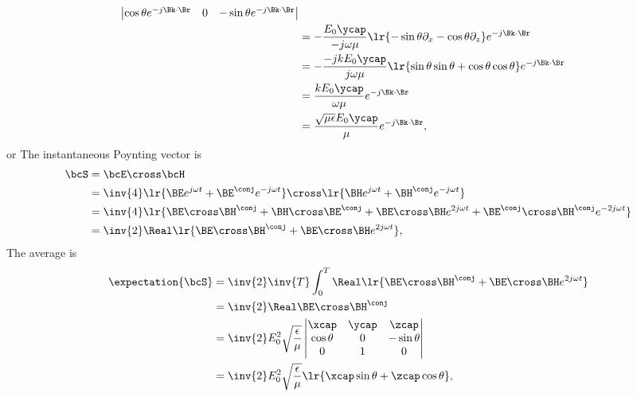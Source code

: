 {{\begin{equation}
\begin{aligned}
\begin{vmatrix}
\cos\theta
e^{-j \Bk \cdot \Br} & 0 &
- \sin\theta
e^{-j \Bk \cdot \Br}
\end{vmatrix}
\\ &=
-\frac{E_0 \ycap}{-j \omega \mu}
\lr{
-\sin\theta \partial_x
-\cos\theta \partial_z
}
e^{-j \Bk \cdot \Br}
\\ &=
-\frac{-j k E_0 \ycap}{j \omega \mu}
\lr{
\sin\theta \sin\theta +
\cos\theta \cos\theta
}
e^{-j \Bk \cdot \Br}
\\ &=
\frac{k E_0 \ycap}{\omega \mu}
e^{-j \Bk \cdot \Br}
\\ &=
\frac{\sqrt{\mu \epsilon}E_0 \ycap}{\mu}
e^{-j \Bk \cdot \Br},
\end{aligned}
\end{equation}
or
The instantaneous Poynting vector is
\begin{equation}\label{eqn:emtproblemSet6Problem3:220}
\begin{aligned}
\bcS
&= \bcE \cross \bcH
\\ &= \inv{4}
\lr{ \BE e^{j \omega t} + \BE^\conj e^{-j\omega t} }
\cross
\lr{ \BH e^{j \omega t} + \BH^\conj e^{-j\omega t} }
\\ &=
\inv{4}
\lr{
\BE \cross \BH^\conj + \BH \cross \BE^\conj + \BE \cross \BH e^{2 j \omega t} + \BE^\conj \cross \BH^\conj e^{-2 j \omega t}
}
\\ &=
\inv{2}
\Real \lr{
\BE \cross \BH^\conj + \BE \cross \BH e^{2 j \omega t}
},
\end{aligned}
\end{equation}
The average is
\begin{equation}\label{eqn:emtproblemSet6Problem3:240}
\begin{aligned}
\expectation{\bcS}
&=
\inv{2}
\inv{T} \int_0^T
\Real \lr{
\BE \cross \BH^\conj + \BE \cross \BH e^{2 j \omega t}
}
\\ &=
\inv{2} \Real \BE \cross \BH^\conj
\\ &=
\inv{2} E_0^2 \sqrt{\frac{\epsilon}{\mu}}
\begin{vmatrix}
\xcap & \ycap & \zcap \\
\cos\theta & 0 & -\sin\theta \\
0 & 1 & 0
\end{vmatrix}
\\ &=
\inv{2} E_0^2 \sqrt{\frac{\epsilon}{\mu}}
\lr{ \xcap \sin\theta + \zcap \cos\theta },
\end{aligned}

\end{equation}}}
